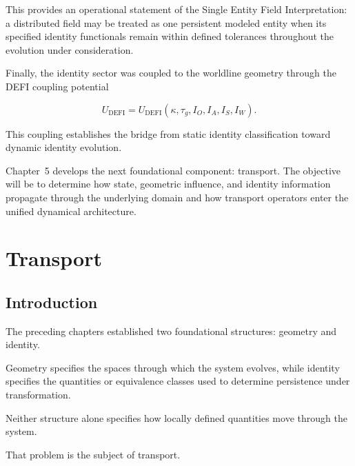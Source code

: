 \documentclass[12pt,oneside]{book}
\newcommand{\DEFI}{\mathrm{DEFI}}
\begin{document}
This provides an operational statement of the Single Entity
Field Interpretation: a distributed field may be treated as one
persistent modeled entity when its specified identity
functionals remain within defined tolerances throughout the
evolution under consideration.

Finally, the identity sector was coupled to the worldline
geometry through the DEFI coupling potential

\begin{equation}
    U_{\DEFI}
    =
    U_{\DEFI}
    \left(
        \kappa,
        \tau_g,
        I_O,
        I_A,
        I_S,
        I_W
    \right).
\end{equation}

This coupling establishes the bridge from static identity
classification toward dynamic identity evolution.

Chapter~5 develops the next foundational component: transport.
The objective will be to determine how state, geometric
influence, and identity information propagate through the
underlying domain and how transport operators enter the unified
dynamical architecture.

\chapter{Transport}
\label{chap:transport}


\section{Introduction}
\label{sec:transport-introduction}

The preceding chapters established two foundational structures:
geometry and identity.

Geometry specifies the spaces through which the system evolves,
while identity specifies the quantities or equivalence classes
used to determine persistence under transformation.

Neither structure alone specifies how locally defined quantities
move through the system.

That problem is the subject of transport.
\end{document}
